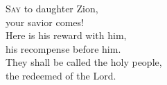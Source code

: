 
\lettrine{S}{ay} to daughter Zion,\\
your savior comes!\\
Here is his reward with him,\\
his recompense before him.\\
They shall be called the holy people,\\
the redeemed of the Lord.
